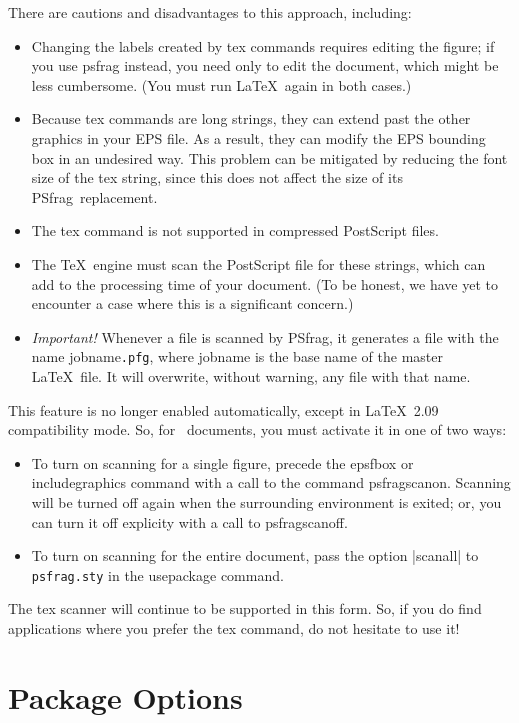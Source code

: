 \documentclass[11pt]{ltxguide}
\let\pkg\textsf
\let\fname\texttt
\newcommand{\pfg}{\pkg{PSfrag}}
\def\cs#1{%
  {\ttfamily\expandafter\string\csname #1\endcsname}}
\begin{document}
There are cautions and disadvantages to this approach, including:
\begin{itemize}
\item Changing the labels created by \cs{tex} commands requires editing
	  the figure; if you use \cs{psfrag} instead, you need only to edit the
	  document, which might be less cumbersome. (You must
	  run \LaTeX\ again in both cases.)
\item Because \cs{tex} commands are long strings, they can extend
	  past the other graphics in your EPS file. As a result, they can modify
	  the EPS bounding box in an undesired way. This problem can be mitigated by
	  reducing the font size of the \cs{tex} string, since this does not affect
	  the size of its \pfg\ replacement.
\item The \cs{tex} command is not supported in compressed PostScript files.
\item The \TeX\ engine must scan the PostScript file for these strings,
	  which can add to the processing time of your document. (To be honest,
	  we have yet to encounter a case where this is a significant concern.)
\item \emph{Important!} Whenever a file is scanned by \pfg,
	  it generates a file with the name \cs{jobname}\fname{.pfg}, where \cs{jobname}
	  is the base name of the master \LaTeX\ file. It will overwrite, without
	  warning, any file with that name.
\end{itemize}

This feature is no longer enabled automatically, except in \LaTeX\ 2.09
compatibility mode. So, for \LaTeXe\ documents, you must activate it in one of
two ways:
\begin{itemize}
\item To turn on scanning for a single figure, precede the \cs{epsfbox}
	  or \cs{includegraphics} command with a call to the command \cs{psfragscanon}.
	  Scanning will be turned off again when the surrounding environment is
	  exited; or, you can turn it off explicity with a call to \cs{psfragscanoff}.
\item To turn on scanning for the entire document, pass the option
	  |scanall| to \fname{psfrag.sty} in the \cs{usepackage} command.
\end{itemize}
The \cs{tex} scanner will continue to be supported in this form. So, if you do
find applications where you prefer the \cs{tex} command, do not hesitate to use
it!

\section{Package Options}
\end{document}
